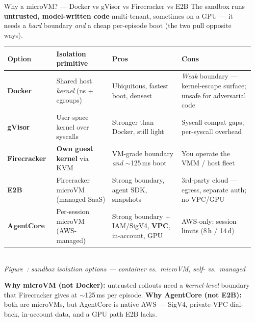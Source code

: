 \documentclass[aspectratio=169]{beamer}
\newcounter{deckfig}
\newcommand{\figtag}[1]{\refstepcounter{deckfig}%
  {\scriptsize\itshape Figure~\thedeckfig: #1}}
\begin{document}
\begin{frame}{Why a microVM? --- Docker vs gVisor vs Firecracker vs E2B}
  \footnotesize The sandbox runs \textbf{untrusted, model-written code} multi-tenant, sometimes on a GPU
  --- it needs a \emph{hard} boundary \emph{and} a cheap per-episode boot (the two pull opposite ways).
  \begin{center}
  \renewcommand{\arraystretch}{0.9}\scriptsize
  \begin{tabular}{@{}p{2.0cm}p{2.75cm}p{3.05cm}p{3.3cm}@{}}
    \toprule
    \textbf{Option} & \textbf{Isolation primitive} & \textbf{Pros} & \textbf{Cons} \\
    \midrule
    \textbf{Docker} & Shared host \emph{kernel} (ns + cgroups) & Ubiquitous, fastest boot, densest & \emph{Weak} boundary --- kernel-escape surface; unsafe for adversarial code \\
    \textbf{gVisor}~\cite{gvisor} & User-space kernel over syscalls & Stronger than Docker, still light & Syscall-compat gaps; per-syscall overhead \\
    \textbf{Firecracker}~\cite{firecracker} & \textbf{Own guest kernel} via KVM & VM-grade boundary \emph{and} $\sim$125\,ms boot & You operate the VMM / host fleet \\
    \textbf{E2B}~\cite{e2b} & Firecracker microVM (managed SaaS) & Strong boundary, agent SDK, snapshots & 3rd-party cloud --- egress, separate auth; no VPC/GPU \\
    \textbf{AgentCore}~\cite{ac-docs} & Per-session microVM (AWS-managed) & Strong boundary + IAM/SigV4, \textbf{VPC}, in-account, GPU & AWS-only; session limits (8\,h / 14\,d) \\
    \bottomrule
  \end{tabular}
  \\[0.2em]\figtag{sandbox isolation options --- container vs.\ microVM, self- vs.\ managed}
  \end{center}
  \vspace{-0.1em}
  {\footnotesize\sloppy \textbf{Why microVM (not Docker):} untrusted rollouts need a \emph{kernel-level}
  boundary that Firecracker gives at $\sim$125\,ms per episode. \textbf{Why AgentCore (not E2B):} both are
  microVMs, but AgentCore is native AWS --- SigV4, private-VPC dial-back, in-account data, and a GPU path
  E2B lacks.\par}
\end{frame}
\end{document}
